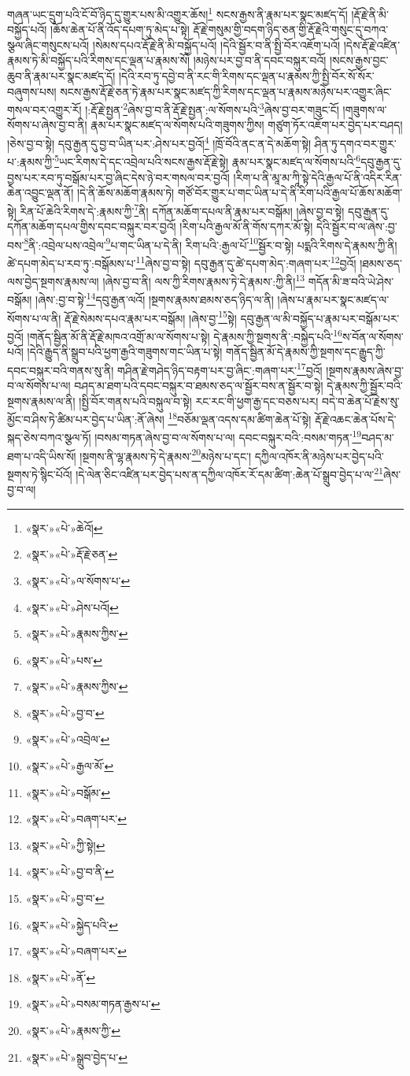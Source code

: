 གཞན་ཡང་དྲུག་པའི་ངོ་བོ་ཉིད་དུ་གྱུར་པས་མི་འགྱུར་ཆོས།\footnote{«སྣར་»«པེ་»ཆེའོ།} སངས་རྒྱས་ནི་རྣམ་པར་སྣང་མཛད་དོ། །རྡོ་རྗེ་ནི་མི་བསྐྱོད་པའོ། །ཆོས་ཆེན་པོ་ནི་འོད་དཔག་ཏུ་མེད་པ་སྟེ། རྡོ་རྗེ་གསུམ་གྱི་བདག་ཉིད་ཅན་གྱི་རྡོ་རྗེའི་གསུང་དུ་བཀའ་སྩལ་ཞིང་གསུངས་པའོ། །སེམས་དཔའ་རྡོ་རྗེ་ནི་མི་བསྐྱོད་པའོ། །དེའི་སྦྱོར་བ་ནི་སྤྱི་བོར་འཇོག་པའོ། །དེས་རྡོ་རྗེ་འཛིན་རྣམས་ཏེ་མི་བསྐྱོད་པའི་རིགས་དང་ལྡན་པ་རྣམས་སོ། །མཉེས་པར་བྱ་བ་ནི་དབང་བསྐུར་བའོ། །སངས་རྒྱས་བྱང་ཆུབ་ནི་རྣམ་པར་སྣང་མཛད་དོ། །དེའི་རབ་ཏུ་དབྱེ་བ་ནི་རང་གི་རིགས་དང་ལྡན་པ་རྣམས་ཀྱི་སྤྱི་བོར་སོ་སོར་བཞུགས་པས། སངས་རྒྱས་རྡོ་རྗེ་ཅན་ཏེ་རྣམ་པར་སྣང་མཛད་ཀྱི་རིགས་དང་ལྡན་པ་རྣམས་མཉེས་པར་འགྱུར་ཞིང་གསལ་བར་འགྱུར་རོ། །:རྡོ་རྗེ་སྤྱན་\footnote{«སྣར་»«པེ་»རྡོ་རྗེ་ཅན་}ཞེས་བྱ་བ་ནི་རྡོ་རྗེ་སྤྱན་:ལ་སོགས་པའི་\footnote{«སྣར་»«པེ་»ལ་སོགས་པ་}ཞེས་བྱ་བར་གཟུང་ངོ། །གཟུགས་ལ་སོགས་པ་ཞེས་བྱ་བ་ནི། རྣམ་པར་སྣང་མཛད་ལ་སོགས་པའི་གཟུགས་ཀྱིས། གཙུག་ཏོར་འཇོག་པར་བྱེད་པར་བཤད། །ཅེས་བྱ་བ་སྟེ། དབུ་རྒྱན་དུ་བྱ་བ་ཡིན་པར་:ཤེས་པར་བྱའོ།\footnote{«སྣར་»«པེ་»ཤེས་པའོ།} །ཁྲོ་བོའི་ནང་ན་དེ་མཆོག་སྟེ། ཤིན་ཏུ་དགའ་བར་གྱུར་པ་:རྣམས་ཀྱི་\footnote{«སྣར་»«པེ་»རྣམས་ཀྱིས་}ཡང་རིགས་དེ་དང་འབྲེལ་པའི་སངས་རྒྱས་རྡོ་རྗེ་སྟེ། རྣམ་པར་སྣང་མཛད་ལ་སོགས་པའི་\footnote{«སྣར་»«པེ་»པས་}དབུ་རྒྱན་དུ་བྱས་པར་རབ་ཏུ་བསྒོམ་པར་བྱ་ཞིང་དེས་ཉེ་བར་གསལ་བར་བྱའོ། །རིག་པ་ནི་མཱ་མ་ཀཱི་སྟེ་དེའི་རྒྱལ་པོ་ནི་འདིར་རིན་ཆེན་འབྱུང་ལྡན་ནོ། །དེ་ནི་ཆོས་མཆོག་རྣམས་ཏེ། གཙོ་བོར་གྱུར་པ་གང་ཡིན་པ་དེ་ནི་རིག་པའི་རྒྱལ་པོ་ཆོས་མཆོག་སྟེ། རིན་པོ་ཆེའི་རིགས་དེ་:རྣམས་ཀྱི་\footnote{«སྣར་»«པེ་»རྣམས་ཀྱིས་}ནི། དཀོན་མཆོག་དཔལ་ནི་རྣམ་པར་བསྒོམ། །ཞེས་བྱ་བ་སྟེ། དབུ་རྒྱན་དུ་དཀོན་མཆོག་དཔལ་གྱིས་དབང་བསྐུར་བར་བྱའོ། །རིག་པའི་རྒྱལ་མོ་ནི་གོས་དཀར་མོ་སྟེ། དེའི་སྦྱོར་བ་ལ་ཞེས་:བྱ་བས་\footnote{«སྣར་»«པེ་»བྱ་བ་}ནི་:འབྲེལ་པས་འབྲེལ་\footnote{«སྣར་»«པེ་»འབྲེལ་}པ་གང་ཡིན་པ་དེ་ནི། རིག་པའི་:རྒྱལ་པོ་\footnote{«སྣར་»«པེ་»རྒྱལ་མོ་}སྦྱོར་བ་སྟེ། པདྨའི་རིགས་དེ་རྣམས་ཀྱི་ནི། ཚེ་དཔག་མེད་པ་རབ་ཏུ་:བསྒོམས་པ་\footnote{«སྣར་»«པེ་»བསྒོམ་}ཞེས་བྱ་བ་སྟེ། དབུ་རྒྱན་དུ་ཚེ་དཔག་མེད་:གཞག་པར་\footnote{«སྣར་»«པེ་»བཞག་པར་}བྱའོ། །ཐམས་ཅད་ལས་བྱེད་སྔགས་རྣམས་ལ། །ཞེས་བྱ་བ་ནི། ལས་ཀྱི་རིགས་རྣམས་ཏེ་དེ་རྣམས་:ཀྱི་ནི།\footnote{«སྣར་»«པེ་»ཀྱི་སྟེ།} གདོན་མི་ཟ་བའི་ཡེ་ཤེས་བསྒོམ། །ཞེས་:བྱ་བ་སྟེ་\footnote{«སྣར་»«པེ་»བྱ་བ་ནི་}དབུ་རྒྱན་ལའོ། །སྔགས་རྣམས་ཐམས་ཅད་ཉིད་ལ་ནི། །ཞེས་པ་རྣམ་པར་སྣང་མཛད་ལ་སོགས་པ་ལ་ནི། རྡོ་རྗེ་སེམས་དཔའ་རྣམ་པར་བསྒོམ། །ཞེས་བྱ་\footnote{«སྣར་»«པེ་»བྱ་བ་}སྟེ། དབུ་རྒྱན་ལ་མི་བསྐྱོད་པ་རྣམ་པར་བསྒོམ་པར་བྱའོ། །གནོད་སྦྱིན་མོ་ནི་རྡོ་རྗེ་མཁའ་འགྲོ་མ་ལ་སོགས་པ་སྟེ། དེ་རྣམས་ཀྱི་སྔགས་ནི་:བསྐྱེད་པའི་\footnote{«སྣར་»«པེ་»སྐྱེད་པའི་}ས་བོན་ལ་སོགས་པའོ། །དེའི་རྒྱུད་ནི་སྒྲུབ་པའི་ཕྱག་རྒྱའི་གཟུགས་གང་ཡིན་པ་སྟེ། གནོད་སྦྱིན་མོ་དེ་རྣམས་ཀྱི་སྔགས་དང་རྒྱུད་ཀྱི་དབང་བསྐུར་བའི་གནས་སུ་ནི། གཤིན་རྗེ་གཤེད་ཉིད་བརྟག་པར་བྱ་ཞིང་:གཞག་པར་\footnote{«སྣར་»«པེ་»བཞག་པར་}བྱའོ། །སྔགས་རྣམས་ཞེས་བྱ་བ་ལ་སོགས་པ་ལ། བཤད་མ་ཐག་པའི་དབང་བསྐུར་བ་ཐམས་ཅད་ལ་སྦྱོར་བས་ན་སྦྱོར་བ་སྟེ། དེ་རྣམས་ཀྱི་སྦྱོར་བའི་སྔགས་རྣམས་ལ་ནི། །སྤྱི་བོར་གནས་པའི་བསྐུལ་བ་སྟེ། རང་རང་གི་ཕྱག་རྒྱ་དང་བཅས་པར། བདེ་བ་ཆེན་པོ་རྗེས་སུ་མྱོང་བ་ཤིས་ཏེ་ཚིམ་པར་བྱེད་པ་ཡིན་:ནོ་ཞེས། \footnote{«སྣར་»«པེ་»ནོ་}བཅོམ་ལྡན་འདས་དམ་ཚིག་ཆེན་པོ་སྟེ། རྡོ་རྗེ་འཆང་ཆེན་པོས་དེ་སྐད་ཅེས་བཀའ་སྩལ་ཏོ། །བསམ་གཏན་ཞེས་བྱ་བ་ལ་སོགས་པ་ལ། དབང་བསྐུར་བའི་:བསམ་གཏན་\footnote{«སྣར་»«པེ་»བསམ་གཏན་རྒྱས་པ་}བཤད་མ་ཐག་པ་འདི་ཡིས་སོ། །སྔགས་ནི་ལྷ་རྣམས་ཏེ་དེ་རྣམས་\footnote{«སྣར་»«པེ་»རྣམས་ཀྱི་}མཉེས་པ་དང་། དཀྱིལ་འཁོར་ནི་མཉེས་པར་བྱེད་པའི་སྔགས་ཏེ་སྙིང་པོའོ། །དེ་ལེན་ཅིང་འཛིན་པར་བྱེད་པས་ན་དཀྱིལ་འཁོར་རོ་དམ་ཚིག་:ཆེན་པོ་སྒྲུབ་བྱེད་པ་ལ་\footnote{«སྣར་»«པེ་»སྒྲུབ་བྱེད་པ་}ཞེས་བྱ་བ་ལ། 